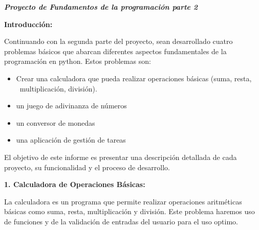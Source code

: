 \documentclass[a4paper]{article}
\newcommand\textstyleListLabelx[1]{\textrm{\textbf{#1}}}
\begin{document}
\bigskip


\bigskip


\bigskip


\bigskip


\bigskip


\bigskip


\bigskip


\bigskip


\bigskip


\bigskip


\bigskip


\bigskip


\bigskip

{\centering{}
\textbf{\textit{Proyecto de Fundamentos de la programación parte 2}}
\par}


\bigskip

{
\textbf{Introducción:}}


\bigskip

{
Continuando con la segunda parte del proyecto, sean desarrollado cuatro problemas básicos que abarcan diferentes
aspectos fundamentales de la programación en python. Estos problemas son: }

\begin{itemize}[series=listWWNumii,label=\textstyleListLabelx{{}-}]
\item {
Crear una calculadora que pueda realizar operaciones básicas (suma, resta, \ multiplicación, división).}
\item {
un juego de adivinanza de números }
\item {
un conversor de monedas \ }
\item {
una aplicación de gestión de tareas}
\end{itemize}
{
El objetivo de este informe es presentar una descripción detallada de cada proyecto, su funcionalidad y el proceso de
desarrollo.}


\bigskip

{
\textbf{1. Calculadora de Operaciones Básicas:}}

{
La calculadora es un programa que permite realizar operaciones aritméticas básicas como suma, resta, multiplicación y
división. Este problema haremos uso de funciones y de la validación de entradas del usuario para el uso optimo.}
\end{document}
